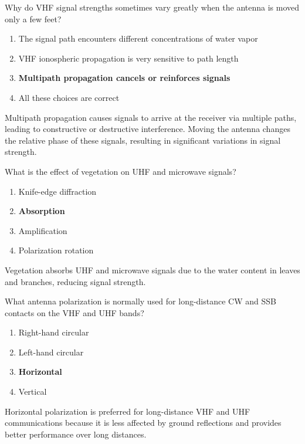 \begin{tcolorbox}[colback=gray!10!white,colframe=black!75!black,title={T3A01}]
    Why do VHF signal strengths sometimes vary greatly when the antenna is moved only a few feet?
    \begin{enumerate}[label=\Alph*),noitemsep]
        \item The signal path encounters different concentrations of water vapor
        \item VHF ionospheric propagation is very sensitive to path length
        \item \textbf{Multipath propagation cancels or reinforces signals}
        \item All these choices are correct
    \end{enumerate}
\end{tcolorbox}
Multipath propagation causes signals to arrive at the receiver via multiple paths, leading to constructive or destructive interference. Moving the antenna changes the relative phase of these signals, resulting in significant variations in signal strength.


\begin{tcolorbox}[colback=gray!10!white,colframe=black!75!black,title={T3A02}]
    What is the effect of vegetation on UHF and microwave signals?
    \begin{enumerate}[label=\Alph*),noitemsep]
        \item Knife-edge diffraction
        \item \textbf{Absorption}
        \item Amplification
        \item Polarization rotation
    \end{enumerate}
\end{tcolorbox}
Vegetation absorbs UHF and microwave signals due to the water content in leaves and branches, reducing signal strength.


\begin{tcolorbox}[colback=gray!10!white,colframe=black!75!black,title={T3A03}]
    What antenna polarization is normally used for long-distance CW and SSB contacts on the VHF and UHF bands?
    \begin{enumerate}[label=\Alph*),noitemsep]
        \item Right-hand circular
        \item Left-hand circular
        \item \textbf{Horizontal}
        \item Vertical
    \end{enumerate}
\end{tcolorbox}
Horizontal polarization is preferred for long-distance VHF and UHF communications because it is less affected by ground reflections and provides better performance over long distances.

